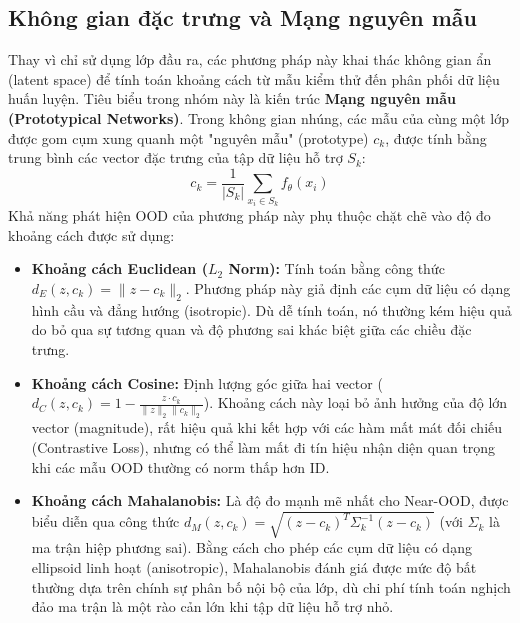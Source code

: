 \subsection{Không gian đặc trưng và Mạng nguyên mẫu }
Thay vì chỉ sử dụng lớp đầu ra, các phương pháp này khai thác không gian ẩn (latent space) để tính toán khoảng cách 
từ mẫu kiểm thử đến phân phối dữ liệu huấn luyện. Tiêu biểu trong nhóm này là kiến trúc 
\textbf{Mạng nguyên mẫu (Prototypical Networks)}.
Trong không gian nhúng, các mẫu của cùng một lớp được gom cụm xung quanh một "nguyên mẫu" (prototype) $c_k$, 
được tính bằng trung bình các vector đặc trưng của tập dữ liệu hỗ trợ 
$S_k$:$$c_k = \frac{1}{|S_k|} \sum_{x_i \in S_k} f_\theta(x_i)$$
Khả năng phát hiện OOD của phương pháp này phụ thuộc chặt chẽ vào độ đo khoảng cách được sử dụng:
\begin{itemize}
  \item \textbf{Khoảng cách Euclidean ($L_2$ Norm):} Tính toán bằng công thức $d_E(z, c_k) = \| z - c_k \|_2$. 
  Phương pháp này giả định các cụm dữ liệu có dạng hình cầu và đẳng hướng (isotropic). 
  Dù dễ tính toán, nó thường kém hiệu quả do bỏ qua sự tương quan và độ phương sai khác biệt giữa các chiều đặc trưng.
  \item \textbf{Khoảng cách Cosine:} Định lượng góc giữa hai vector ($d_C(z, c_k) = 1 - \frac{z \cdot c_k}{\|z\|_2 \|c_k\|_2}$). 
  Khoảng cách này loại bỏ ảnh hưởng của độ lớn vector (magnitude), rất hiệu quả khi kết hợp với các hàm mất mát đối chiếu 
  (Contrastive Loss), nhưng có thể làm mất đi tín hiệu nhận diện quan trọng khi các mẫu OOD thường có norm thấp hơn ID.
  \item \textbf{Khoảng cách Mahalanobis:} Là độ đo mạnh mẽ nhất cho Near-OOD, được biểu diễn qua công thức 
  $d_M(z, c_k) = \sqrt{(z - c_k)^T \Sigma_k^{-1} (z - c_k)}$ (với $\Sigma_k$ là ma trận hiệp phương sai). 
  Bằng cách cho phép các cụm dữ liệu có dạng ellipsoid linh hoạt (anisotropic), 
  Mahalanobis đánh giá được mức độ bất thường dựa trên chính sự phân bố nội bộ của lớp, 
  dù chi phí tính toán nghịch đảo ma trận là một rào cản lớn khi tập dữ liệu hỗ trợ nhỏ.
\end{itemize}

